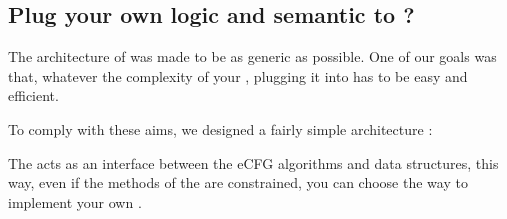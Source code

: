 \subsection{ Plug your own logic and semantic to \flatac ?}
The architecture of \flatac was made to be as generic as possible. One of our goals was that, whatever the complexity of your , plugging it into \flatac has to be easy and efficient.

\newpar To comply with these aims, we designed a fairly simple architecture :\\

\begin{center}\end{center}

The  acts as an interface between the \gls{eCFG} algorithms and data structures, this way, even if the methods of the  are constrained, you can choose the way to implement your own .
